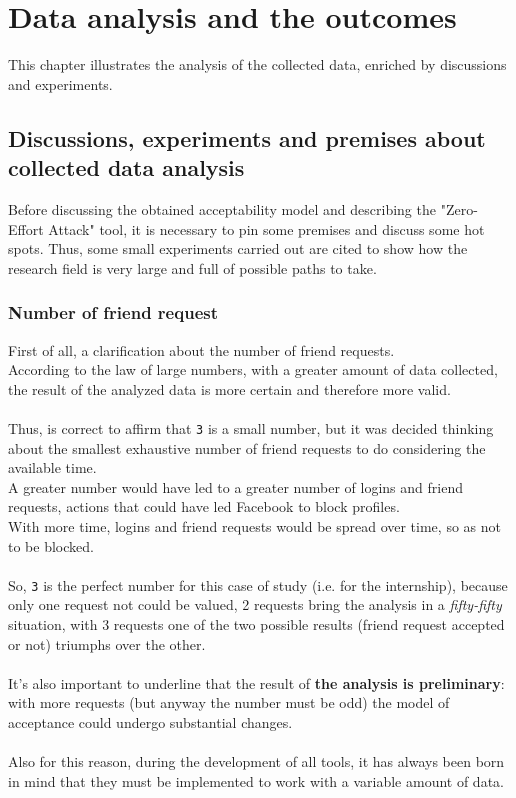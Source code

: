 
\chapter{Data analysis and the outcomes}
\label{cap:data-analysis}
This chapter illustrates the analysis of the collected data, enriched by discussions and experiments.
\section{Discussions, experiments and premises about collected data analysis}
Before discussing the obtained acceptability model and describing the "Zero-Effort Attack" tool, it is necessary to pin some premises and discuss some hot spots. Thus, some small experiments carried out are cited to show how the research field is very large and full of possible paths to take.

\subsection{Number of friend request}
\label{cap:number-friend-req}
First of all, a clarification about the number of friend requests.\\
According to the law of large numbers, with a greater amount of data collected, the result of the analyzed data is more certain and therefore more valid.\\\\Thus, is correct to affirm that \texttt{3} is a small number, but it was decided thinking about the smallest exhaustive number of friend requests to do considering the available time.\\A greater number would have led to a greater number of logins and friend requests, actions that could have led Facebook to block profiles.\\With more time, logins and friend requests would be spread over time, so as not to be blocked.\\\\So, \texttt{3} is the perfect number for this case of study (i.e. for the internship), because only one request not could be valued, 2 requests bring the analysis in a \textit{fifty-fifty} situation, with 3 requests one of the two possible results (friend request accepted or not) triumphs over the other.\\\\It's also important to underline that the result of \textbf{the analysis is preliminary}: with more requests (but anyway the number must be odd) the model of acceptance could undergo substantial changes.\\\\Also for this reason, during the development of all tools, it has always been born in mind that they must be implemented to work with a variable amount of data.
